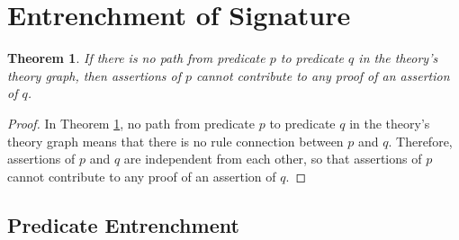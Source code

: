 \documentclass[11pt,letterpaper]{article}
\newtheorem{theorem}{Theorem}[section]
\begin{document}
\section{Entrenchment of Signature}
\label{sec:ee:sig}


\begin{theorem}
\label{therem:ref:theog}
If there is no path from predicate $p$ to predicate $q$ in the theory's theory graph, then assertions of $p$ cannot contribute to any proof of an assertion of $q$.
\end{theorem}
\begin{proof}
In Theorem \ref{therem:ref:theog}, no path from predicate $p$ to predicate $q$ in the theory's theory graph means that there is no rule connection between $p$ and $q$. Therefore, assertions of $p$ and $q$ are independent from each other, so that assertions of $p$ cannot contribute to any proof of an assertion of $q$. 
\end{proof}

\subsection{Predicate Entrenchment}
\end{document}
